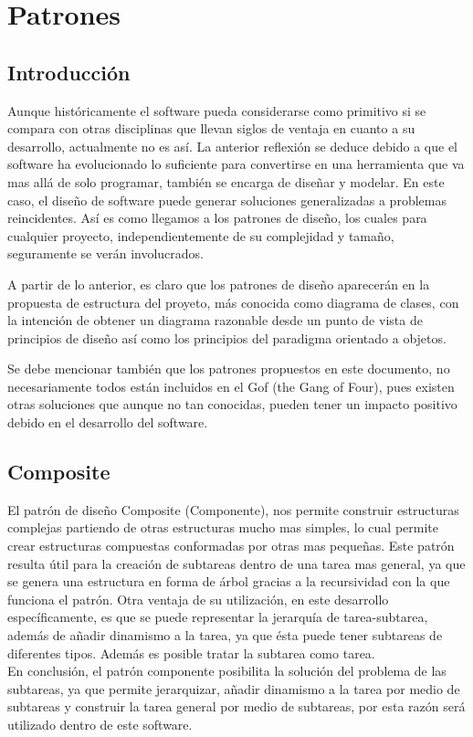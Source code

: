 \chapter{Patrones}
\section{Introducción}
Aunque históricamente el software pueda considerarse como primitivo si se compara con otras disciplinas que llevan siglos de ventaja en cuanto a su desarrollo, actualmente no es así. La anterior reflexión se deduce debido a que el software ha evolucionado lo suficiente para convertirse en una herramienta que va mas allá de solo programar, también se encarga de diseñar y modelar. En este caso, el diseño de software puede generar soluciones generalizadas a problemas reincidentes. Así es como llegamos a los patrones de diseño, los cuales para cualquier proyecto, independientemente de su complejidad y tamaño, seguramente se verán involucrados.

A partir de lo anterior, es claro que los patrones de diseño aparecerán en la propuesta de estructura del proyeto, más conocida como diagrama de clases, con la intención de obtener un diagrama razonable desde un punto de vista de principios de diseño así como los principios del paradigma orientado a objetos. 

Se debe mencionar también que los patrones propuestos en este documento, no necesariamente todos están incluidos en el Gof (the Gang of Four), pues existen otras soluciones que aunque no tan conocidas, pueden tener un impacto positivo debido en el desarrollo del software.
\newpage

\section{Composite}
El patrón de diseño Composite (Componente), nos permite construir estructuras complejas partiendo de otras estructuras mucho mas simples, lo cual permite crear estructuras compuestas conformadas por otras mas pequeñas. Este patrón resulta útil para la creación de subtareas dentro de una tarea mas general, ya que se genera una estructura en forma de árbol gracias a la recursividad con la que funciona el patrón. Otra ventaja de su utilización, en este desarrollo específicamente,  es que se puede representar la jerarquía de tarea-subtarea, además de añadir dinamismo a la tarea, ya que ésta puede tener subtareas de diferentes tipos. Además es posible tratar la subtarea como tarea.
\\
En conclusión, el patrón componente posibilita la solución del problema de las subtareas, ya que permite jerarquizar, añadir dinamismo a la tarea por medio de subtareas y construir la tarea general por medio de subtareas, por esta razón será utilizado dentro de este software.

